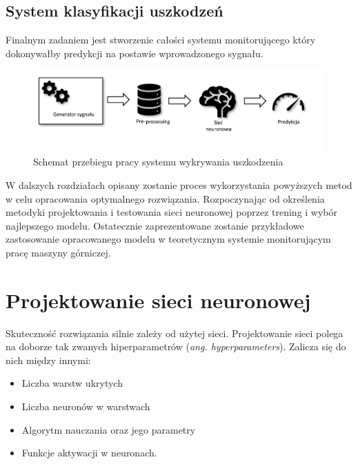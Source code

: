 \documentclass[inzynierska]{pwr_wmat_praca_dyplomowa}
\theoremstyle{plain}
\numberwithin{theorem}{chapter}
\theoremstyle{definition}
\numberwithin{theorem}{chapter}
\begin{document}
\section{System klasyfikacji uszkodzeń}
Finalnym zadaniem jest stworzenie całości systemu monitorującego który dokonywałby predykcji na postawie wprowadzonego sygnału. 
\begin{figure}[ht]
	\centering
	\includegraphics[scale=0.7]{images/workflow_c.pdf}
	\caption{Schemat przebiegu pracy systemu wykrywania uszkodzenia}
	\label{proces-koncowy}
\end{figure}

W dalszych rozdziałach opisany zostanie proces wykorzystania powyższych metod w celu opracowania optymalnego rozwiązania. Rozpoczynając od określenia metodyki projektowania i testowania sieci neuronowej poprzez trening i wybór najlepszego modelu. Ostatecznie zaprezentowane zostanie przykładowe zastosowanie opracowanego modelu w teoretycznym systemie monitorującym pracę maszyny górniczej. 










\chapter{Projektowanie sieci neuronowej}
Skuteczność rozwiązania silnie zależy od użytej sieci. Projektowanie sieci polega na doborze tak zwanych hiperparametrów (\textit{ang. hyperparameters}). Zalicza się do nich między innymi:
\begin{itemize}
	\item Liczba warstw ukrytych
	\item Liczba neuronów w warstwach
	\item Algorytm nauczania oraz jego parametry
	\item Funkcje aktywacji w neuronach.
\end{itemize}
\end{document}
